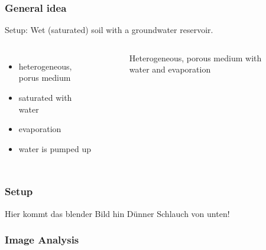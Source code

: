 \begin{frame}
	\frametitle{General idea}
	\vspace{1cm} %
	
	Setup: Wet (saturated) soil with a groundwater reservoir.
	\begin{columns}[t]
		\column{3cm}
		\begin{itemize}
     
		\item heterogeneous, porus medium
		\item saturated with water
		\item evaporation
		\item water is pumped up
     
    
		\end{itemize}
    
		\pause
    
		\column{7cm}
		\begin{figure}
		\centering
		\caption{Heterogeneous, porous medium with water and evaporation}
		
		\end{figure}
      \end{columns}
\end{frame}

\begin{frame}
	\frametitle{Setup}
	\vspace{1cm} %
	
	Hier kommt das blender Bild hin
	Dünner Schlauch von unten!
 
\end{frame}

\begin{frame}
	\frametitle{Image Analysis}
	\vspace{1cm} %
	
	
 
\end{frame}

